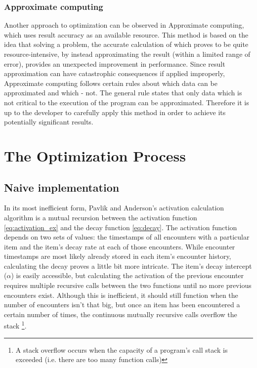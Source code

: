 \documentclass[a4paper]{report}
\begin{document}
\subsection{Approximate computing}
Another approach to optimization can be observed in Approximate computing, which uses result accuracy as an available resource. This method is based on the idea that solving a problem, the accurate calculation of which proves to be quite resource-intensive, by instead approximating the result (within a limited range of error), provides an unexpected improvement in performance. Since result approximation can have catastrophic consequences if applied improperly, Approximate computing follows certain rules about which data can be approximated and which - not. The general rule states that only data which is not critical to the execution of the program can be approximated. Therefore it is up to the developer to carefully apply this method in order to achieve its potentially significant results. \citep{approx_computing}



\chapter{The Optimization Process}
\section{Naive implementation}
In its most inefficient form, Pavlik and Anderson's activation calculation algorithm is a mutual recursion between the activation function \ref{eq:activation_ex} and the decay function \ref{eq:decay}. The activation function depends on two sets of values: the timestamps of all encounters with a particular item and the item's decay rate at each of those encounters. While encounter timestamps are most likely already stored in each item's encounter history, calculating the decay proves a little bit more intricate. The item's decay intercept ($\alpha$) is easily accessible, but calculating the activation of the previous encounter requires multiple recursive calls between the two functions until no more previous encounters exist. Although this is inefficient, it should still function when the number of encounters isn't that big, but once an item has been encountered a certain number of times, the continuous mutually recursive calls overflow the stack \footnote{A stack overflow occurs when the capacity of a program's call stack is exceeded (i.e. there are too many function calls)}.
\end{document}
